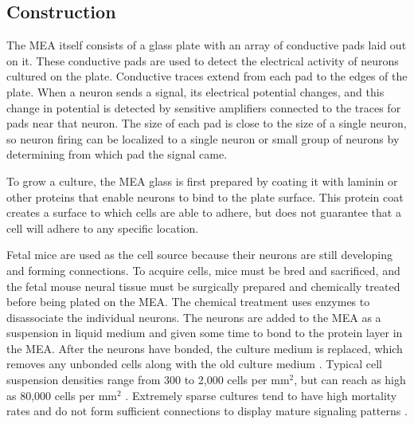 \documentclass[letterpaper]{article}
\begin{document}
\subsection{Construction}
The MEA itself consists of a glass plate with an array of conductive pads laid out on it. %
These conductive pads are used to detect the electrical activity of neurons cultured on the plate.
Conductive traces extend from each pad to the edges of the plate. 
When a neuron sends a signal, its electrical potential changes, and this change in potential is detected by sensitive amplifiers connected to the traces for pads near that neuron.
The size of each pad is close to the size of a single neuron, so neuron firing can be localized to a single neuron or small group of neurons by determining from which pad the signal came.


To grow a culture, the MEA glass is first prepared by coating it with laminin or other proteins that enable neurons to bind to the plate surface. 
This protein coat creates a surface to which cells are able to adhere, but does not guarantee that a cell will adhere to any specific location.

Fetal mice are used as the cell source because their neurons are still developing and forming connections. 
To acquire cells, mice must be bred and sacrificed, and the fetal mouse neural tissue must be surgically prepared and chemically treated before being plated on the MEA. 
The chemical treatment uses enzymes to disassociate the individual neurons. 
The neurons are added to the MEA as a suspension in liquid medium and given some time to bond to the protein layer in the MEA.
After the neurons have bonded, the culture medium is replaced, which removes any unbonded cells along with the old culture medium \cite{wagenaar2006extremely}.
Typical cell suspension densities range from 300 to 2,000 cells per mm$^2$, but can reach as high as 80,000 cells per mm$^2$ \cite{shea2009optimization,ruaro2005toward}.
Extremely sparse cultures tend to have high mortality rates and do not form sufficient connections to display mature signaling patterns \cite{shea2009optimization}.
\end{document}
